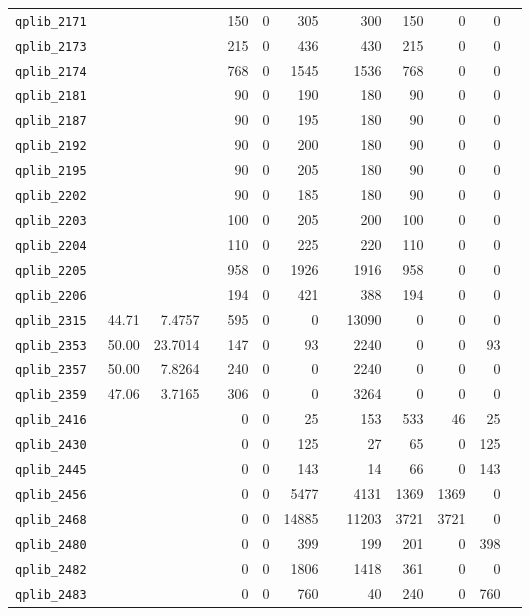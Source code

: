 \begin{longtable}{lrrrrrrrrrrrr}
{\tt 	qplib\_2171	}	&		&		&	&	150	&	0	&	305	&	&	300	&	150	&	0	&	0	\\
{\tt 	qplib\_2173	}	&		&		&	&	215	&	0	&	436	&	&	430	&	215	&	0	&	0	\\
{\tt 	qplib\_2174	}	&		&		&	&	768	&	0	&	1545	&	&	1536	&	768	&	0	&	0	\\
{\tt 	qplib\_2181	}	&		&		&	&	90	&	0	&	190	&	&	180	&	90	&	0	&	0	\\
{\tt 	qplib\_2187	}	&		&		&	&	90	&	0	&	195	&	&	180	&	90	&	0	&	0	\\
{\tt 	qplib\_2192	}	&		&		&	&	90	&	0	&	200	&	&	180	&	90	&	0	&	0	\\
{\tt 	qplib\_2195	}	&		&		&	&	90	&	0	&	205	&	&	180	&	90	&	0	&	0	\\
{\tt 	qplib\_2202	}	&		&		&	&	90	&	0	&	185	&	&	180	&	90	&	0	&	0	\\
{\tt 	qplib\_2203	}	&		&		&	&	100	&	0	&	205	&	&	200	&	100	&	0	&	0	\\
{\tt 	qplib\_2204	}	&		&		&	&	110	&	0	&	225	&	&	220	&	110	&	0	&	0	\\
{\tt 	qplib\_2205	}	&		&		&	&	958	&	0	&	1926	&	&	1916	&	958	&	0	&	0	\\
{\tt 	qplib\_2206	}	&		&		&	&	194	&	0	&	421	&	&	388	&	194	&	0	&	0	\\
{\tt 	qplib\_2315	}	&	44.71	&	7.4757	&	&	595	&	0	&	0	&	&	13090	&	0	&	0	&	0	\\
{\tt 	qplib\_2353	}	&	50.00	&	23.7014	&	&	147	&	0	&	93	&	&	2240	&	0	&	0	&	93	\\
{\tt 	qplib\_2357	}	&	50.00	&	7.8264	&	&	240	&	0	&	0	&	&	2240	&	0	&	0	&	0	\\
{\tt 	qplib\_2359	}	&	47.06	&	3.7165	&	&	306	&	0	&	0	&	&	3264	&	0	&	0	&	0	\\
{\tt 	qplib\_2416	}	&		&		&	&	0	&	0	&	25	&	&	153	&	533	&	46	&	25	\\
{\tt 	qplib\_2430	}	&		&		&	&	0	&	0	&	125	&	&	27	&	65	&	0	&	125	\\
{\tt 	qplib\_2445	}	&		&		&	&	0	&	0	&	143	&	&	14	&	66	&	0	&	143	\\
{\tt 	qplib\_2456	}	&		&		&	&	0	&	0	&	5477	&	&	4131	&	1369	&	1369	&	0	\\
{\tt 	qplib\_2468	}	&		&		&	&	0	&	0	&	14885	&	&	11203	&	3721	&	3721	&	0	\\
{\tt 	qplib\_2480	}	&		&		&	&	0	&	0	&	399	&	&	199	&	201	&	0	&	398	\\
{\tt 	qplib\_2482	}	&		&		&	&	0	&	0	&	1806	&	&	1418	&	361	&	0	&	0	\\
{\tt 	qplib\_2483	}	&		&		&	&	0	&	0	&	760	&	&	40	&	240	&	0	&	760	\\

\end{longtable}
